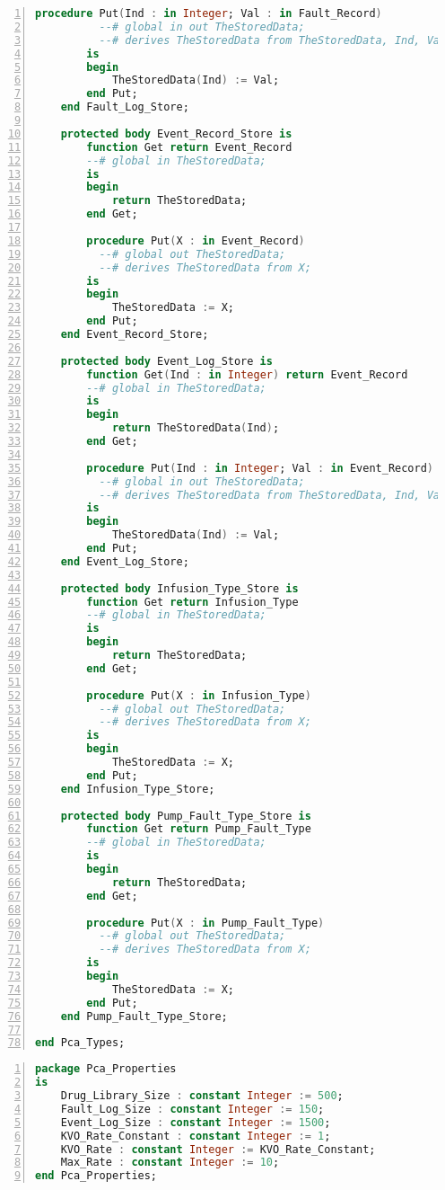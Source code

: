 \begin{lstlisting}[language=ada, gobble=0, numbers=left, caption={\lstinline{Pca_Types} package}]
        procedure Put(Ind : in Integer; Val : in Fault_Record)
          --# global in out TheStoredData;
          --# derives TheStoredData from TheStoredData, Ind, Val;
        is
        begin
            TheStoredData(Ind) := Val;
        end Put;
    end Fault_Log_Store;

    protected body Event_Record_Store is
        function Get return Event_Record
        --# global in TheStoredData;
        is
        begin
            return TheStoredData;
        end Get;

        procedure Put(X : in Event_Record)
          --# global out TheStoredData;
          --# derives TheStoredData from X;
        is
        begin
            TheStoredData := X;
        end Put;
    end Event_Record_Store;

    protected body Event_Log_Store is
        function Get(Ind : in Integer) return Event_Record
        --# global in TheStoredData;
        is
        begin
            return TheStoredData(Ind);
        end Get;

        procedure Put(Ind : in Integer; Val : in Event_Record)
          --# global in out TheStoredData;
          --# derives TheStoredData from TheStoredData, Ind, Val;
        is
        begin
            TheStoredData(Ind) := Val;
        end Put;
    end Event_Log_Store;

    protected body Infusion_Type_Store is
        function Get return Infusion_Type
        --# global in TheStoredData;
        is
        begin
            return TheStoredData;
        end Get;

        procedure Put(X : in Infusion_Type)
          --# global out TheStoredData;
          --# derives TheStoredData from X;
        is
        begin
            TheStoredData := X;
        end Put;
    end Infusion_Type_Store;

    protected body Pump_Fault_Type_Store is
        function Get return Pump_Fault_Type
        --# global in TheStoredData;
        is
        begin
            return TheStoredData;
        end Get;

        procedure Put(X : in Pump_Fault_Type)
          --# global out TheStoredData;
          --# derives TheStoredData from X;
        is
        begin
            TheStoredData := X;
        end Put;
    end Pump_Fault_Type_Store;

end Pca_Types;
\end{lstlisting} 
\label{listing:pca_generated:pca_types}
\doublespacing


\singlespacing
\begin{lstlisting}[language=ada, gobble=0, numbers=left, caption={\lstinline{Pca_Properties} package}]
package Pca_Properties
is
    Drug_Library_Size : constant Integer := 500;
    Fault_Log_Size : constant Integer := 150;
    Event_Log_Size : constant Integer := 1500;
    KVO_Rate_Constant : constant Integer := 1;
    KVO_Rate : constant Integer := KVO_Rate_Constant;
    Max_Rate : constant Integer := 10;
end Pca_Properties;
\end{lstlisting} 
\label{listing:pca_generated:pca_properties}
\doublespacing

